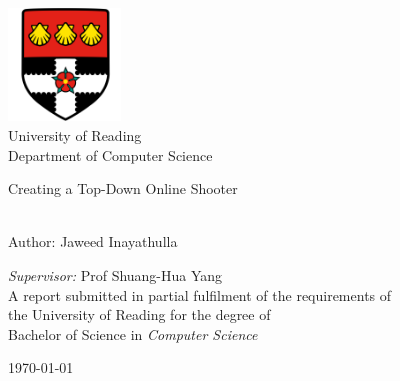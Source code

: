 \documentclass[a4paper,11pt,oneside]{book}
\begin{document}
    \begin{titlepage}      
        \begin{center}
            \includegraphics[width=3cm]{figures/uorlogo.png}\\[0.5cm]
            {\LARGE University of Reading\\[0.5cm]
            Department of Computer Science}\\[2cm]
			
            \linespread{1.2}\huge {
                Creating a Top-Down Online Shooter
            
            }
            \linespread{1}~\\[2cm]
            {\Large 
                Author: Jaweed Inayathulla\\
            }
            

            {\large 
                \emph{Supervisor:} Prof Shuang-Hua Yang}\\[1cm] %
            
            \large A report submitted in partial fulfilment of the requirements of\\the University of Reading for the degree of\\ Bachelor of Science in \textit{Computer Science}\\[0.3cm] 
            \vfill
            
            
            \today %
        \end{center}
    \end{titlepage}
    
\end{document}

